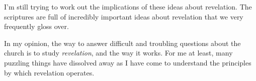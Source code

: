\begin{compactitem}
\begin{compactitem}
					\item I'm still trying to work out the implications of these ideas about revelation. The scriptures are full of incredibly important ideas about revelation that we very frequently gloss over.
					\item In my opinion, the way to answer difficult and troubling questions about the church is to study \textit{revelation}, and the way it works. For me at least, many puzzling things have dissolved away as I have come to understand the principles by which revelation operates.
				\end{compactitem}
				
				

\end{compactitem}
